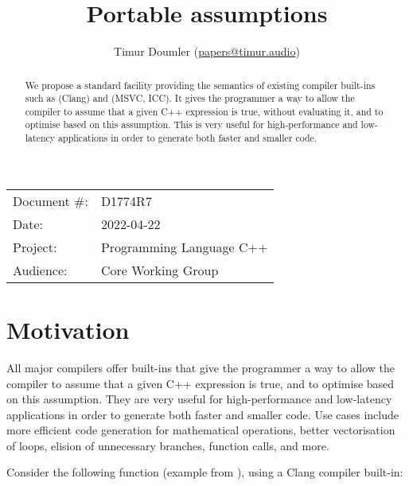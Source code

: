 

\newcommand{\forceindent}{\parindent=1em\indent\parindent=0pt\relax} %


\title{Portable assumptions}
\author{
  Timur Doumler \small(\href{mailto:papers@timur.audio}{papers@timur.audio})
}
\date{}
\maketitle

\begin{tabular}{ll}
Document \#: & D1774R7 \\
Date: & 2022-04-22\\
Project: & Programming Language C++ \\
Audience: & Core Working Group
\end{tabular}


\begin{abstract}
We propose a standard facility providing the semantics of existing compiler built-ins such as  (Clang) and  (MSVC, ICC). It gives the programmer a way to allow the compiler to assume that a given C++ expression is true, without evaluating it, and to optimise based on this assumption. This is very useful for high-performance and low-latency applications in order to generate both faster and smaller code.
\end{abstract}

\vspace{5mm}

\section{Motivation}
\label{sec:motivation}

All major compilers offer built-ins that give the programmer a way to allow the compiler to assume that a given C++ expression is true, and to optimise based on this assumption. They are very useful for high-performance and low-latency applications in order to generate both faster and smaller code. Use cases include more efficient code generation for mathematical operations, better vectorisation of loops, elision of unnecessary branches, function calls, and more.

Consider the following function (example from \cite{Regehr2014}), using a Clang compiler built-in:


